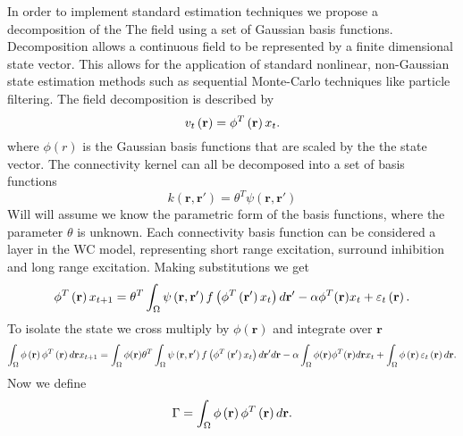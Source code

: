\documentclass[onecolumn,draftcls]{IEEEtran}
\begin{document}
In order to implement standard estimation techniques we propose a decomposition of the The field using a set of Gaussian basis functions. Decomposition allows a continuous field to be represented by a finite dimensional state vector. This allows for the application of standard nonlinear, non-Gaussian state estimation methods such as sequential Monte-Carlo techniques like particle filtering. The field decomposition is described by
\begin{equation}\label{DefFieldDecomp}
{v_t}\left( {\bf{r}} \right) = {\phi ^T}\left( {\bf{r}} \right){x_t}.
\end{equation}
where $\phi(r)$ is the Gaussian basis functions that are scaled by the the state vector. The connectivity kernel can all be decomposed into a set of basis functions
\begin{equation}\label{DefKernelDecomp}
k( \mathbf{r} , \mathbf{r'} ) = \theta^T\psi(\mathbf{r} , \mathbf{r'} )
\end{equation}
Will will assume we know the parametric form of the basis functions, where the parameter $\theta$ is unknown. Each connectivity basis function can be considered a layer in the WC model, representing short range excitation, surround inhibition and long range excitation. Making substitutions we get
\begin{equation}\label{DecompModel}
{\phi ^T}\left( \mathbf{r} \right){x_{t+1}} = \theta^T\int_\Omega  {\psi \left( {{\bf{r}} , {\mathbf{r'}}} \right)f\left( {{\phi ^T}\left( {{\mathbf{r'}}} \right){x_t}} \right)d{\mathbf{r'}}}  - \alpha\phi^T(\mathbf{r})x_t + {\varepsilon _t}\left( {\mathbf{r}} \right).
\end{equation}
To isolate the state we cross multiply by $\phi(\mathbf{r})$ and integrate over $\mathbf{r}$
\begin{equation}\label{Poo}
\int_\Omega  {\phi \left( {\bf{r}} \right){\phi ^T}\left( {\bf{r}} \right)d{\bf{r}}{x_{t+1}}}  = \int_\Omega  {\phi ( \mathbf{r} )\theta^T\int_\Omega  {\psi \left( {{\bf{r}} , {\bf{r'}}} \right)f\left( {{\phi ^T}\left( {{\bf{r'}}} \right){x_t}} \right)d{\bf{r'}}} d{\bf{r}}}  - \alpha\int_\Omega \phi(\mathbf{r})\phi^T(\mathbf{r})d\mathbf{r} x_t  + \int_\Omega  {\phi \left( {\mathbf{r}} \right){\varepsilon _t}\left( {\mathbf{r}} \right)d{\mathbf{r}}}.
\end{equation}
Now we define
\begin{equation}\label{DefGamma}
\Gamma  = \int_\Omega  {\phi \left( {\bf{r}} \right){\phi ^T}\left( {\bf{r}} \right)d{\bf{r}}}.
\end{equation}
\end{document}
